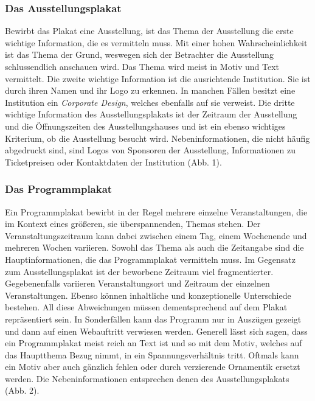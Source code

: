 \documentclass[a4paper,12pt,ngerman]{article}
\begin{document}
\subsubsection{Das Ausstellungsplakat}
Bewirbt das Plakat eine Ausstellung, ist das Thema der Ausstellung die erste wichtige Information, die es vermitteln muss. Mit einer hohen Wahrscheinlichkeit ist das Thema der Grund, weswegen sich der Betrachter die Ausstellung schlussendlich anschauen wird. Das Thema wird meist in Motiv und Text vermittelt. Die zweite wichtige Information ist die ausrichtende Institution. Sie ist durch ihren Namen und ihr Logo zu erkennen. In manchen Fällen besitzt eine Institution ein \textit{Corporate Design}, welches ebenfalls auf sie verweist. Die dritte wichtige Information des Ausstellungsplakats ist der Zeitraum der Ausstellung und die Öffnungszeiten des Ausstellungshauses und ist ein ebenso wichtiges Kriterium, ob die Ausstellung besucht wird. Nebeninformationen, die nicht häufig abgedruckt sind, sind Logos von Sponsoren der Ausstellung, Informationen zu Ticketpreisen oder Kontaktdaten der Institution (Abb. 1). \\

\subsubsection{Das Programmplakat}
Ein Programmplakat bewirbt in der Regel mehrere einzelne Veranstaltungen, die im Kontext eines größeren, sie überspannenden, Themas stehen. Der Veranstaltungszeitraum kann dabei zwischen einem Tag, einem Wochenende und mehreren Wochen variieren. Sowohl das Thema als auch die Zeitangabe sind die Hauptinformationen, die das Programmplakat vermitteln muss. Im Gegensatz zum Ausstellungsplakat ist der beworbene Zeitraum viel fragmentierter. Gegebenenfalls variieren Veranstaltungsort und Zeitraum der einzelnen Veranstaltungen. Ebenso können inhaltliche und konzeptionelle Unterschiede bestehen. All diese Abweichungen müssen dementsprechend auf dem Plakat repräsentiert sein. In Sonderfällen kann das Programm nur in Auszügen gezeigt und dann auf einen Webauftritt verwiesen werden. Generell lässt sich sagen, dass ein Programmplakat meist reich an Text ist und so mit dem Motiv, welches auf das Hauptthema Bezug nimmt, in ein Spannungsverhältnis tritt. Oftmals kann ein Motiv aber auch gänzlich fehlen oder durch verzierende Ornamentik ersetzt werden. Die Nebeninformationen entsprechen denen des Ausstellungsplakats (Abb. 2). \\
\end{document}
